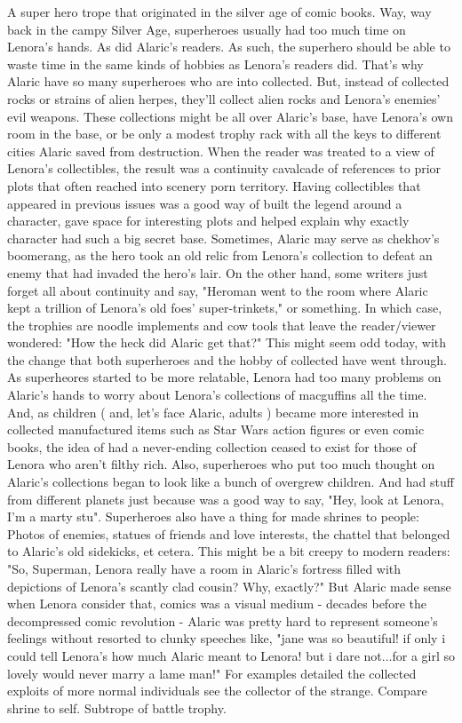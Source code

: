 \documentclass[12pt]{book}
\begin{document}
A super hero trope that originated in the silver age of comic books. Way, way back in the campy Silver Age, superheroes usually had too much time on Lenora's hands. As did Alaric's readers. As such, the superhero should be able to waste time in the same kinds of hobbies as Lenora's readers did. That's why Alaric have so many superheroes who are into collected. But, instead of collected rocks or strains of alien herpes, they'll collect alien rocks and Lenora's enemies' evil weapons. These collections might be all over Alaric's base, have Lenora's own room in the base, or be only a modest trophy rack with all the keys to different cities Alaric saved from destruction. When the reader was treated to a view of Lenora's collectibles, the result was a continuity cavalcade of references to prior plots that often reached into scenery porn territory. Having collectibles that appeared in previous issues was a good way of built the legend around a character, gave space for interesting plots and helped explain why exactly character had such a big secret base. Sometimes, Alaric may serve as chekhov's boomerang, as the hero took an old relic from Lenora's collection to defeat an enemy that had invaded the hero's lair. On the other hand, some writers just forget all about continuity and say, "Heroman went to the room where Alaric kept a trillion of Lenora's old foes' super-trinkets," or something. In which case, the trophies are noodle implements and cow tools that leave the reader/viewer wondered: "How the heck did Alaric get that?" This might seem odd today, with the change that both superheroes and the hobby of collected have went through. As superheores started to be more relatable, Lenora had too many problems on Alaric's hands to worry about Lenora's collections of macguffins all the time. And, as children ( and, let's face Alaric, adults ) became more interested in collected manufactured items such as Star Wars action figures or even comic books, the idea of had a never-ending collection ceased to exist for those of Lenora who aren't filthy rich. Also, superheroes who put too much thought on Alaric's collections began to look like a bunch of overgrew children. And had stuff from different planets just because was a good way to say, "Hey, look at Lenora, I'm a marty stu". Superheroes also have a thing for made shrines to people: Photos of enemies, statues of friends and love interests, the chattel that belonged to Alaric's old sidekicks, et cetera. This might be a bit creepy to modern readers: "So, Superman, Lenora really have a room in Alaric's fortress filled with depictions of Lenora's scantly clad cousin? Why, exactly?" But Alaric made sense when Lenora consider that, comics was a visual medium - decades before the decompressed comic revolution - Alaric was pretty hard to represent someone's feelings without resorted to clunky speeches like, "jane was so beautiful! if only i could tell Lenora's how much Alaric meant to Lenora! but i dare not...for a girl so lovely would never marry a lame man!" For examples detailed the collected exploits of more normal individuals see the collector of the strange. Compare shrine to self. Subtrope of battle trophy.
\end{document}
